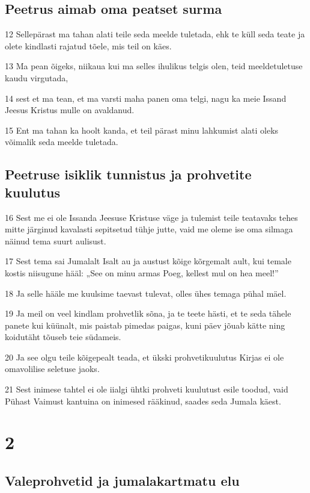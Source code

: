 \section*{Peetrus aimab oma peatset surma}

\par 12 Sellepärast ma tahan alati teile seda meelde tuletada, ehk te küll seda teate ja olete kindlasti rajatud tõele, mis teil on käes.
\par 13 Ma pean õigeks, niikaua kui ma selles ihulikus telgis olen, teid meeldetuletuse kaudu virgutada,
\par 14 sest et ma tean, et ma varsti maha panen oma telgi, nagu ka meie Issand Jeesus Kristus mulle on avaldanud.
\par 15 Ent ma tahan ka hoolt kanda, et teil pärast minu lahkumist alati oleks võimalik seda meelde tuletada.

\section*{Peetruse isiklik tunnistus ja prohvetite kuulutus}

\par 16 Sest me ei ole Issanda Jeesuse Kristuse väge ja tulemist teile teatavaks tehes mitte järginud kavalasti sepitsetud tühje jutte, vaid me oleme ise oma silmaga näinud tema suurt aulisust.
\par 17 Sest tema sai Jumalalt Isalt au ja austust kõige kõrgemalt ault, kui temale kostis niisugune hääl: „See on minu armas Poeg, kellest mul on hea meel!”
\par 18 Ja selle hääle me kuulsime taevast tulevat, olles ühes temaga pühal mäel.
\par 19 Ja meil on veel kindlam prohvetlik sõna, ja te teete hästi, et te seda tähele panete kui küünalt, mis paistab pimedas paigas, kuni päev jõuab kätte ning koidutäht tõuseb teie südameis.
\par 20 Ja see olgu teile kõigepealt teada, et ükski prohvetikuulutus Kirjas ei ole omavolilise seletuse jaoks.
\par 21 Sest inimese tahtel ei ole iialgi ühtki prohveti kuulutust esile toodud, vaid Pühast Vaimust kantuina on inimesed rääkinud, saades seda Jumala käest.


\chapter{2}

\section*{Valeprohvetid ja jumalakartmatu elu}

